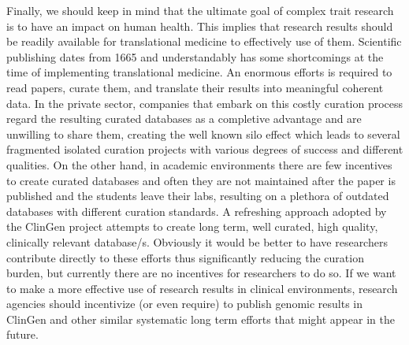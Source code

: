 Finally, we should keep in mind that the ultimate goal of complex trait research is to have an impact on human health.
This implies that research results should be readily available for translational medicine to effectively use of them.
Scientific publishing dates from 1665 and understandably has some shortcomings at the time of implementing translational medicine.
An enormous efforts is required to read papers, curate them, and translate their results into meaningful coherent data.
In the private sector, companies that embark on this costly curation process regard the resulting curated databases as a completive advantage and are unwilling to share them, creating the well known silo effect which leads to several fragmented isolated curation projects with various degrees of success and different qualities.
On the other hand, in academic environments there are few incentives to create curated databases and often they are not maintained after the paper is published and the students leave their labs, resulting on a plethora of outdated databases with different curation standards.
A refreshing approach adopted by the ClinGen project attempts to create long term, well curated, high quality, clinically relevant database/s.
Obviously it would be better to have researchers contribute directly to these efforts thus significantly reducing the curation burden, but currently there are no incentives for researchers to do so.
If we want to make a more effective use of research results in clinical environments, research agencies should incentivize (or even require) to publish genomic results in ClinGen and other similar systematic long term efforts that might appear in the future.

